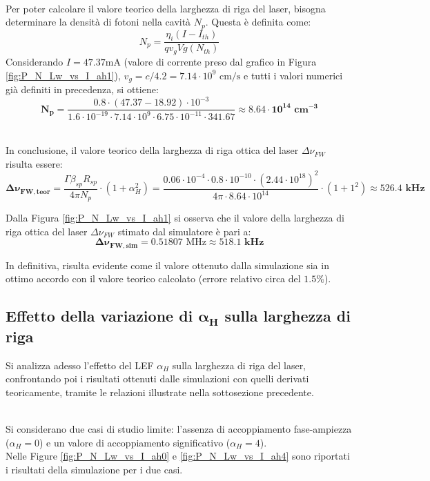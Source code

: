 \noindent\\ Per poter calcolare il valore teorico della larghezza di riga del laser, bisogna determinare la densità di fotoni nella cavità $N_p$. Questa è definita come:
\begin{equation}
    N_p = \frac{\eta_i (I-I_{th})}{q v_g V g(N_{th})}
\end{equation}
\noindent Considerando $I = 47.37 \text{mA}$ (valore di corrente preso dal grafico in Figura \ref{fig:P_N_Lw_vs_I_ah1}), $v_g = c/4.2 = 7.14 \cdot 10^9 \text{ cm/s}$ e
tutti i valori numerici già definiti in precedenza, si ottiene:
\[
    \boldsymbol{N_p} = \frac{0.8 \cdot (47.37 - 18.92) \cdot 10^{-3}}{1.6 \cdot 10^{-19} \cdot 7.14 \cdot 10^9 \cdot 6.75 \cdot 10^{-11} \cdot 341.67} \approx \boldsymbol{8.64 \cdot 10^{14} \text{ cm}^{-3}}
\]

\noindent\\ In conclusione, il valore teorico della larghezza di riga ottica del laser $\Delta\nu_{FW}$ risulta essere:
\[
    \boldsymbol{\Delta\nu_{FW,teor}} = \frac{\Gamma \beta_{sp} R_{sp}}{4\pi N_p} \cdot (1 + \alpha_H^2) = \frac{0.06 \cdot 10^{-4} \cdot 0.8 \cdot 10^{-10} \cdot (2.44 \cdot 10^{18})^2}{4 \pi \cdot 8.64 \cdot 10^{14}} \cdot (1 + 1^2) \approx \boldsymbol{526.4 \textbf{ kHz}}
\]

\noindent Dalla Figura \ref{fig:P_N_Lw_vs_I_ah1} si osserva che il valore della larghezza di riga ottica del laser $\Delta\nu_{FW}$ stimato dal simulatore è pari a:
\[
    \boldsymbol{\Delta\nu_{FW,sim}} = 0.51807 \text{ MHz} \approx \boldsymbol{518.1 \textbf{ kHz}}
\]

\noindent In definitiva, risulta evidente come il valore ottenuto dalla simulazione sia in ottimo accordo con il valore teorico calcolato
(errore relativo circa del $1.5\%$).

\newpage
\subsection{Effetto della variazione di $\boldsymbol{\alpha_H}$ sulla larghezza di riga}
Si analizza adesso l'effetto del LEF $\alpha_H$ sulla larghezza di riga del laser, confrontando poi i risultati ottenuti dalle simulazioni con quelli derivati teoricamente,
tramite le relazioni illustrate nella sottosezione precedente.

\noindent\\ Si considerano due casi di studio limite: l'assenza di accoppiamento fase-ampiezza ($\alpha_H = 0$) e un valore di accoppiamento significativo ($\alpha_H = 4$).
\noindent\\ Nelle Figure \ref{fig:P_N_Lw_vs_I_ah0} e \ref{fig:P_N_Lw_vs_I_ah4} sono riportati i risultati della simulazione per i due casi.

